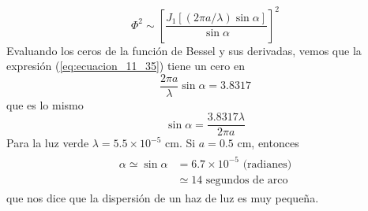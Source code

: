 \begin{equation}
\Phi^{2} \sim \left[ \dfrac{J_{1} [(2 \pi a / \lambda) \sin \alpha]}{\sin \alpha} \right]^{2}
\label{eq:ecuacion_11_35}
\end{equation}
Evaluando los ceros de la función de Bessel y sus derivadas, vemos que la expresión (\ref{eq:ecuacion_11_35}) tiene un cero en
\begin{equation}
\dfrac{2 \pi a}{\lambda} \sin \alpha =  3.8317
\label{eq:ecuacion_11_36}
\end{equation}
que es lo mismo
\begin{equation}
\sin \alpha = \dfrac{3.8317 \lambda}{2 \pi a}
\label{eq:ecuacion_11_37}
\end{equation}
Para la luz verde $\lambda=5.5 \times 10^{-5}$ cm. Si $a=0.5$ cm, entonces
\begin{eqnarray}
\begin{aligned}
\alpha \simeq \sin \alpha &= 6.7 \times 10^{-5} \text{ (radianes)} \\
&\simeq 14 \text{ segundos de arco}
\end{aligned}
\label{eq:ecuacion_11_38}
\end{eqnarray}
que nos dice que la dispersión de un haz de luz es muy pequeña.

